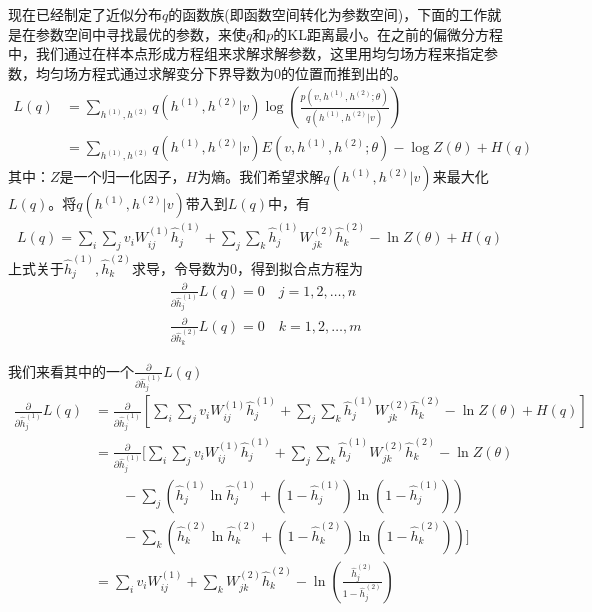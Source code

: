         \par
        现在已经制定了近似分布$q$的函数族(即函数空间转化为参数空间)，下面的工作就是在参数空间中寻找最优的参数，来使$q$和$p$的KL距离最小。在之前的偏微分方程中，我们通过在样本点形成方程组来求解求解参数，这里用均匀场方程来指定参数，均匀场方程式通过求解变分下界导数为0的位置而推到出的。
        \begin{align*}
        L(q) & = \sum_{h^{(1)},h^{(2)}} q(h^{(1)},h^{(2)}|v) \log \left( \frac{p(v,h^{(1)},h^{(2)};\theta)}{q(h^{(1)},h^{(2)}|v)} \right) \\
        & = \sum_{h^{(1)},h^{(2)}} q(h^{(1)},h^{(2)}|v) E(v,h^{(1)},h^{(2)};\theta) - \log Z(\theta) + H(q)
        \end{align*}
        其中：$Z$是一个归一化因子，$H$为熵。我们希望求解$q(h^{(1)},h^{(2)}|v)$来最大化$L(q)$。将$q(h^{(1)},h^{(2)}|v)$带入到$L(q)$中，有
        \begin{align*}
        L(q) = \sum_i\sum_j v_iW_{i{j}}^{(1)}\hat{h}_j^{(1)} + \sum_j\sum_k\hat{h}_j^{(1)} W_{jk}^{(2)} \hat{h}_k^{(2)} - \ln Z(\theta) + H(q)
        \end{align*}
        上式关于$\hat{h}_j^{(1)},\hat{h}_k^{(2)}$求导，令导数为0，得到拟合点方程为
        \begin{align*}
        & \frac{\partial }{\partial \hat{h}_j^{(1)}} L(q) = 0\quad j = 1,2,\dots,n\\
        & \frac{\partial }{\partial \hat{h}_k^{(2)}} L(q) = 0\quad k = 1,2,\dots,m
        \end{align*}
        \par
        我们来看其中的一个$\frac{\partial }{\partial \hat{h}_j^{(1)}} L(q)$
        \begin{align*}
        \frac{\partial }{\partial \hat{h}_j^{(1)}} L(q) &= \frac{\partial }{\partial \hat{h}_j^{(1)}} \left[ \sum_i\sum_j v_iW_{i{j}}^{(1)}\hat{h}_j^{(1)} + \sum_j\sum_k\hat{h}_j^{(1)} W_{jk}^{(2)} \hat{h}_k^{(2)} - \ln Z(\theta) + H(q) \right]\\
        &= \frac{\partial }{\partial \hat{h}_j^{(1)}} \bigg[ \sum_i\sum_j v_iW_{i{j}}^{(1)}\hat{h}_j^{(1)} + \sum_j\sum_k\hat{h}_j^{(1)} W_{jk}^{(2)} \hat{h}_k^{(2)} - \ln Z(\theta) \\
        &\qquad - \sum_j \left( \hat{h}_j^{(1)}\ln \hat{h}_j^{(1)} + (1-\hat{h}_j^{(1)}) \ln(1-\hat{h}_j^{(1)})  \right) \\
        &\qquad - \sum_k \left( \hat{h}_k^{(2)}\ln \hat{h}_k^{(2)} + (1-\hat{h}_k^{(2)}) \ln(1-\hat{h}_k^{(2)})  \right) \bigg]\\
        &=\sum_{i}v_iW_{ij}^{(1)}+\sum_kW_{jk}^{(2)}\hat{h}_k^{(2)} - \ln \left( \frac{\hat{h}_j^{(2)}}{1-\hat{h}_j^{(2)}} \right)
        \end{align*}
